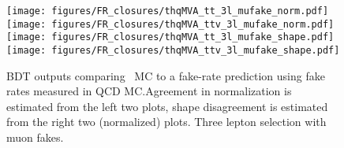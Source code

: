 \begin{figure}[htb]
 \centering
 \texttt{[image: figures/FR\_closures/thqMVA\_tt\_3l\_mufake\_norm.pdf]} 
 \texttt{[image: figures/FR\_closures/thqMVA\_ttv\_3l\_mufake\_norm.pdf]} 
 \texttt{[image: figures/FR\_closures/thqMVA\_tt\_3l\_mufake\_shape.pdf]} 
 \texttt{[image: figures/FR\_closures/thqMVA\_ttv\_3l\_mufake\_shape.pdf]} 
\caption{BDT outputs comparing \ttbar\ MC to a fake-rate prediction using fake rates measured in QCD MC.\@ Agreement in normalization is estimated from the left two plots, shape disagreement is estimated from the right two (normalized) plots. Three lepton selection with muon fakes.} 
\label{fig:frclosure_3l_mufake}
\end{figure}


















































